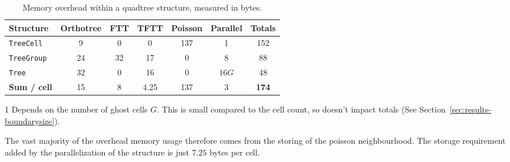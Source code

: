 \documentclass[twoside]{IIBproject}
\numberwithin{figure}{section}
\begin{document}
        \begin{table}[!htbp]
            \centering
            \caption{Memory overhead within a quadtree structure, measured in bytes.}
            \label{tab:results-memusage}
            \begin{threeparttable}
                \begin{tabular}{@{}l>{\hskip 1cm}ccccc>{\hskip 1cm}c@{}}
                \toprule
                \textbf{Structure}  & Orthotree & FTT & TFTT & Poisson & Parallel & \textbf{Totals} \\ \midrule
                \texttt{TreeCell}   & 9         & 0   & 0    & 137     & 1        & 152    \\ %
                \texttt{TreeGroup}  & 24        & 32  & 17   & 0       & 8        & 88     \\ %
                \texttt{Tree}       & 32        & 0   & 16   & 0       & $16G$\tnote{1}        & 48     \\ \addlinespace[4mm] \cmidrule{7-7} %
                \textbf{Sum / cell} & 15        & 8   & 4.25 & 137     & 3        & \textbf{174}    \\ \bottomrule
                \end{tabular}
                \begin{tablenotes}
                    \item[1] Depends on the number of ghost cells $G$. This is small compared to the cell count, so doesn't impact totals (See Section~\ref{sec:results-boundarysize}).
                \end{tablenotes}
            \end{threeparttable}
        \end{table}

        The vast majority of the overhead memory usage therefore comes from the storing of the poisson neighbourhood. The storage requirement added by the parallelization of the structure is just $7.25$ bytes per cell. 






\end{document}
